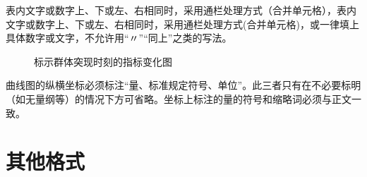 \documentclass{cqupt_thesis}
\begin{document}
    表内文字或数字上、下或左、右相同时，采用通栏处理方式（合并单元格），表内文字或数字上、下或左、右相同时，采用通栏处理方式(合并单元格)，或一律填上具体数字或文字，不允许用“〃”“同上”之类的写法。



    \begin{figure}[H]
        \centering
		
		\caption[标示群体突现时刻的指标变化图]{ 标示群体突现时刻的指标变化图\cite{陈浩元2015gb} }
        \centering
        
    \end{figure}
    曲线图的纵横坐标必须标注“量、标准规定符号、单位”。此三者只有在不必要标明（如无量纲等）的情况下方可省略。坐标上标注的量的符号和缩略词必须与正文一致。


    \chapter{其他格式}
\end{document}
